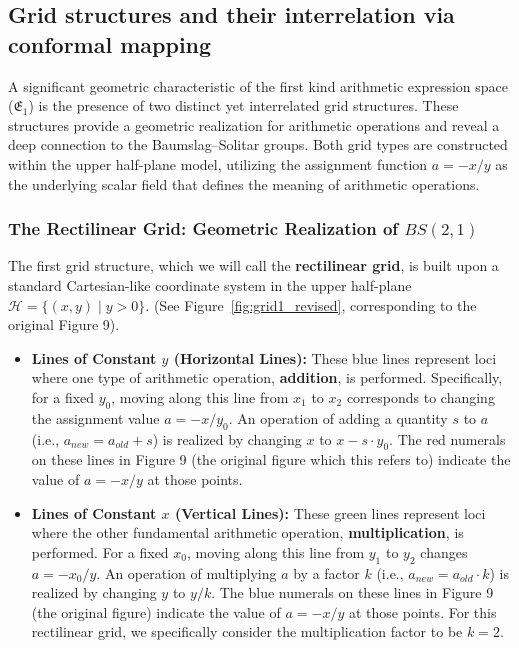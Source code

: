 \subsection{Grid structures and their interrelation via conformal mapping}\label{subsec:grids_revised}

A significant geometric characteristic of the first kind arithmetic expression space ($\mathfrak{E}_1$) is the presence of two distinct yet interrelated grid structures. These structures provide a geometric realization for arithmetic operations and reveal a deep connection to the Baumslag--Solitar groups. Both grid types are constructed within the upper half-plane model, utilizing the assignment function $a = -x/y$ as the underlying scalar field that defines the meaning of arithmetic operations.

\subsubsection{The Rectilinear Grid: Geometric Realization of $BS(2,1)$}

The first grid structure, which we will call the \textbf{rectilinear grid}, is built upon a standard Cartesian-like coordinate system in the upper half-plane $\mathcal{H} = \{(x,y) \mid y>0\}$. (See Figure~\ref{fig:grid1_revised}, corresponding to the original Figure 9).

\begin{itemize}
    \item \textbf{Lines of Constant $y$ (Horizontal Lines):} These blue lines represent loci where one type of arithmetic operation, \textbf{addition}, is performed. Specifically, for a fixed $y_0$, moving along this line from $x_1$ to $x_2$ corresponds to changing the assignment value $a = -x/y_0$. An operation of adding a quantity $s$ to $a$ (i.e., $a_{new} = a_{old} + s$) is realized by changing $x$ to $x - s \cdot y_0$. The red numerals on these lines in Figure 9 (the original figure which this refers to) indicate the value of $a = -x/y$ at those points.
    \item \textbf{Lines of Constant $x$ (Vertical Lines):} These green lines represent loci where the other fundamental arithmetic operation, \textbf{multiplication}, is performed. For a fixed $x_0$, moving along this line from $y_1$ to $y_2$ changes $a = -x_0/y$. An operation of multiplying $a$ by a factor $k$ (i.e., $a_{new} = a_{old} \cdot k$) is realized by changing $y$ to $y/k$. The blue numerals on these lines in Figure 9 (the original figure) indicate the value of $a = -x/y$ at those points. For this rectilinear grid, we specifically consider the multiplication factor to be $k=2$.
\end{itemize}

